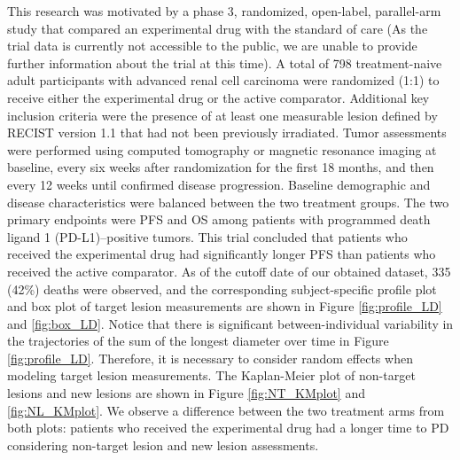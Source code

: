 This research was motivated by a phase 3, randomized, open-label, parallel-arm study that compared an experimental drug with the standard of care (As the trial data is currently not accessible to the public, we are unable to provide further information about the trial at this time). A total of 798 treatment-naive adult participants with advanced renal cell carcinoma were randomized (1:1) to receive either the experimental drug or the active comparator. Additional key inclusion criteria were the presence of at least one measurable lesion defined by \acs{RECIST} version 1.1 that had not been previously irradiated. Tumor assessments were performed using computed tomography or magnetic resonance imaging at baseline, every six weeks after randomization for the first 18 months, and then every 12 weeks until confirmed disease progression. Baseline demographic and disease characteristics were balanced between the two treatment groups. The two primary endpoints were \ac{PFS} and \ac{OS} among patients with programmed death ligand 1 (PD-L1)–positive tumors. This trial concluded that patients who received the experimental drug had significantly longer \ac{PFS} than patients who received the active comparator. As of the cutoff date of our obtained dataset, 335 (42\%) deaths were observed, and the corresponding subject-specific profile plot and box plot of target lesion measurements are shown in Figure \ref{fig:profile_LD} and \ref{fig:box_LD}. Notice that there is significant between-individual variability in the trajectories of the sum of the longest diameter over time in Figure \ref{fig:profile_LD}. Therefore, it is necessary to consider random effects when modeling target lesion measurements. The Kaplan-Meier plot of non-target lesions and new lesions are shown in Figure \ref{fig:NT_KMplot} and \ref{fig:NL_KMplot}. We observe a difference between the two treatment arms from both plots: patients who received the experimental drug had a longer time to \ac{PD} considering non-target lesion and new lesion assessments.

